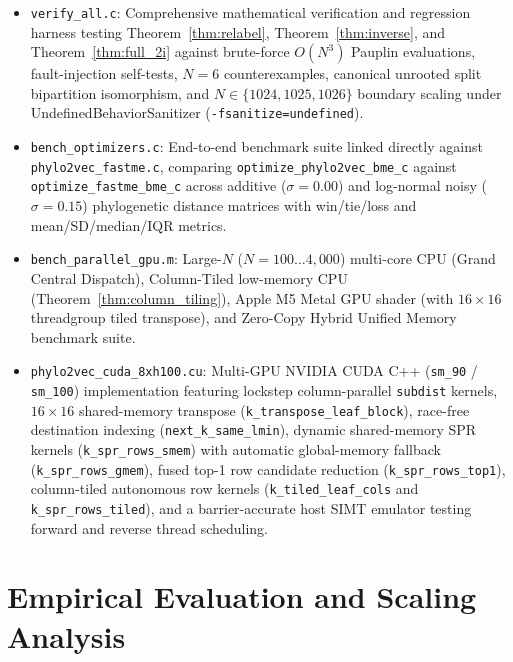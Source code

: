 \documentclass[11pt,a4paper]{article}
\theoremstyle{definition}
\begin{document}
\begin{itemize}
    \item \texttt{verify\_all.c}: Comprehensive mathematical verification and regression harness testing Theorem~\ref{thm:relabel}, Theorem~\ref{thm:inverse}, and Theorem~\ref{thm:full_2i} against brute-force $O(N^3)$ Pauplin evaluations, fault-injection self-tests, $N=6$ counterexamples, canonical unrooted split bipartition isomorphism, and $N \in \{1024, 1025, 1026\}$ boundary scaling under UndefinedBehaviorSanitizer (\texttt{-fsanitize=undefined}).
    \item \texttt{bench\_optimizers.c}: End-to-end benchmark suite linked directly against \texttt{phylo2vec\_fastme.c}, comparing \texttt{optimize\_phylo2vec\_bme\_c} against \texttt{optimize\_fastme\_bme\_c} across additive ($\sigma = 0.00$) and log-normal noisy ($\sigma = 0.15$) phylogenetic distance matrices with win/tie/loss and mean/SD/median/IQR metrics.
    \item \texttt{bench\_parallel\_gpu.m}: Large-$N$ ($N = 100 \dots 4{,}000$) multi-core CPU (Grand Central Dispatch), Column-Tiled low-memory CPU (Theorem~\ref{thm:column_tiling}), Apple M5 Metal GPU shader (with $16 \times 16$ threadgroup tiled transpose), and Zero-Copy Hybrid Unified Memory benchmark suite.
    \item \texttt{phylo2vec\_cuda\_8xh100.cu}: Multi-GPU NVIDIA CUDA C++ (\texttt{sm\_90} / \texttt{sm\_100}) implementation featuring lockstep column-parallel \texttt{subdist} kernels, $16 \times 16$ shared-memory transpose (\texttt{k\_transpose\_leaf\_block}), race-free destination indexing (\texttt{next\_k\_same\_lmin}), dynamic shared-memory SPR kernels (\texttt{k\_spr\_rows\_smem}) with automatic global-memory fallback (\texttt{k\_spr\_rows\_gmem}), fused top-1 row candidate reduction (\texttt{k\_spr\_rows\_top1}), column-tiled autonomous row kernels (\texttt{k\_tiled\_leaf\_cols} and \texttt{k\_spr\_rows\_tiled}), and a barrier-accurate host SIMT emulator testing forward and reverse thread scheduling.
\end{itemize}

\section{Empirical Evaluation and Scaling Analysis}
\label{sec:experiments}
\end{document}

